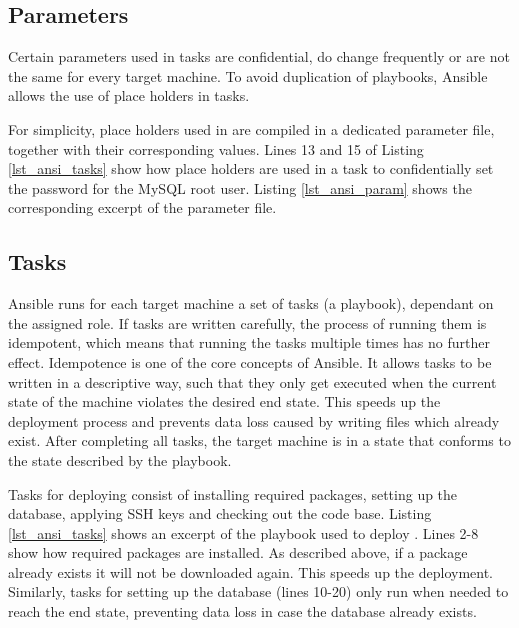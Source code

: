 \subsection{Parameters}
Certain parameters used in tasks are confidential, do change frequently or are not the same for every target machine. To avoid duplication of playbooks, Ansible allows the use of place holders in tasks.

For simplicity, place holders used in \lcs are compiled in a dedicated parameter file, together with their corresponding values. Lines 13 and 15 of Listing \ref{lst_ansi_tasks} show how place holders are used in a task to confidentially set the password for the MySQL root user. Listing \ref{lst_ansi_param} shows the corresponding excerpt of the parameter file.

\subsection{Tasks}
Ansible runs for each target machine a set of tasks (a playbook), dependant on the assigned role. If tasks are written carefully, the process of running them is idempotent, which means that running the tasks multiple times has no further effect. Idempotence is one of the core concepts of Ansible. It allows tasks to be written in a descriptive way, such that they only get executed when the current state of the machine violates the desired end state. This speeds up the deployment process and prevents data loss caused by writing files which already exist. After completing all tasks, the target machine is in a state that conforms to the state described by the playbook.

Tasks for deploying \lcs consist of installing required packages, setting up the database, applying SSH keys and checking out the code base. Listing \ref{lst_ansi_tasks} shows an excerpt of the playbook used to deploy \lcs. Lines 2-8 show how required packages are installed. As described above, if a package already exists it will not be downloaded again. This speeds up the deployment. Similarly, tasks for setting up the database (lines 10-20) only run when needed to reach the end state, preventing data loss in case the database already exists.